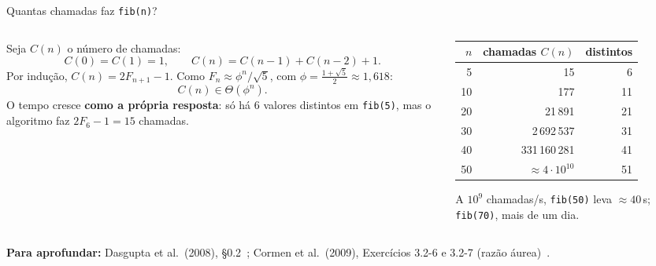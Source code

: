 \documentclass[aspectratio=169,xcolor=table]{beamer}
\newcommand{\fonte}[1]{%
  \vfill
  {\tiny\color{gray!55!black}\textbf{Para aprofundar:} #1\par}%
}
\begin{document}
\begin{frame}{Quantas chamadas faz \texttt{fib(n)}?}
  \begin{columns}[c]
    \begin{column}{0.5\textwidth}
      \scriptsize Seja $C(n)$ o número de chamadas:
      \[ C(0)=C(1)=1, \qquad C(n) = C(n-1) + C(n-2) + 1. \]
      Por indução, $C(n) = 2F_{n+1}-1$. Como $F_n \approx \phi^n/\sqrt5$, com
      $\phi = \frac{1+\sqrt5}{2}\approx 1{,}618$:
      \[ C(n) \in \Theta(\phi^n). \]
      O tempo cresce \textbf{como a própria resposta}: só há 6 valores distintos em
      \texttt{fib(5)}, mas o algoritmo faz $2F_6-1=15$ chamadas.
    \end{column}
    \begin{column}{0.44\textwidth}
      \centering\scriptsize
      \begin{tabular}{rrr}
        \toprule
        $n$ & chamadas $C(n)$ & distintos \\
        \midrule
        5  & 15 & 6 \\
        10 & 177 & 11 \\
        20 & 21\,891 & 21 \\
        30 & 2\,692\,537 & 31 \\
        40 & 331\,160\,281 & 41 \\
        50 & $\approx 4\cdot 10^{10}$ & 51 \\
        \bottomrule
      \end{tabular}
      \medskip

      A $10^9$ chamadas/s, \texttt{fib(50)} leva $\approx 40$\,s;
      \texttt{fib(70)}, mais de um dia.
    \end{column}
  \end{columns}
  \fonte{Dasgupta et al.\ (2008), \S 0.2~\cite{dasgupta2008algorithms};
    Cormen et al.\ (2009), Exercícios 3.2-6 e 3.2-7 (razão áurea)~\cite{cormen2009introduction}.}
\end{frame}
\end{document}
